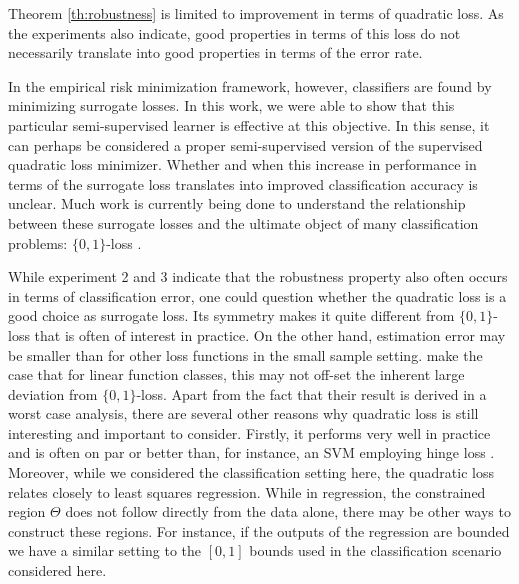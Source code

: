 \documentclass{article}
\begin{document}
Theorem \ref{th:robustness} is limited to improvement in terms of quadratic loss. As the experiments also indicate, good properties in terms of this loss do not necessarily translate into good properties in terms of the error rate.

In the empirical risk minimization framework, however, classifiers are found by minimizing surrogate losses. In this work, we were able to show that this particular semi-supervised learner is effective at this objective. In this sense, it can perhaps be considered a proper semi-supervised version of the supervised quadratic loss minimizer. Whether and when this increase in performance in terms of the surrogate loss translates into improved classification accuracy is unclear. Much work is currently being done to understand the relationship between these surrogate losses and the ultimate object of many classification problems: $\{0,1\}$-loss \citep{Bartlett2006, Ben-David2012}.

While experiment 2 and 3 indicate that the robustness property also often occurs in terms of classification error, one could question whether the quadratic loss is a good choice as surrogate loss. Its symmetry makes it quite different from $\{0,1\}$-loss that is often of interest in practice. On the other hand, estimation error may be smaller than for other loss functions in the small sample setting. \citep{Ben-David2012} make the case that for linear function classes, this may not off-set the inherent large deviation from $\{0,1\}$-loss. Apart from the fact that their result is derived in a worst case analysis, there are several other reasons why quadratic loss is still interesting and important to consider. Firstly, it performs very well in practice and is often on par or better than, for instance, an SVM employing hinge loss \citep{Rasmussen2005,Hastie2001,Poggio2003}. Moreover, while we considered the classification setting here, the quadratic loss relates closely to least squares regression. While in regression, the constrained region $\Theta$ does not follow directly from the data alone, there may be other ways to construct these regions. For instance, if the outputs of the regression are bounded we have a similar setting to the $[0,1]$ bounds used in the classification scenario considered here.
\end{document}

